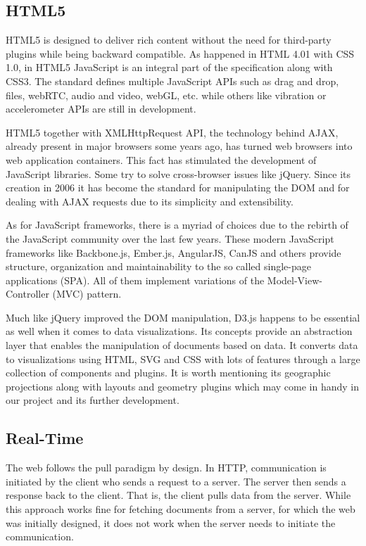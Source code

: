 \subsection{HTML5}

HTML5 is designed to deliver rich content without the need for third-party plugins while being backward compatible. As happened in HTML 4.01 with CSS 1.0, in HTML5 JavaScript is an integral part of the specification along with CSS3. The standard defines multiple JavaScript APIs such as drag and drop, files, webRTC, audio and video, webGL, etc. while others like vibration or accelerometer APIs are still in development.

HTML5 together with XMLHttpRequest API, the technology behind AJAX, already present in major browsers some years ago, has turned web browsers into web application containers. This fact has stimulated the development of JavaScript libraries. Some try to solve cross-browser issues like jQuery. Since its creation in 2006 it has become the standard for manipulating the DOM and for dealing with AJAX requests due to its simplicity and extensibility.

As for JavaScript frameworks, there is a myriad of choices due to the rebirth of the JavaScript community over the last few years. These modern JavaScript frameworks like Backbone.js, Ember.js, AngularJS, CanJS and others provide structure, organization and maintainability to the so called single-page applications (SPA). All of them implement variations of the Model-View-Controller (MVC) pattern.

Much like jQuery improved the DOM manipulation, D3.js happens to be essential as well when it comes to data visualizations. Its concepts provide an abstraction layer that enables the manipulation of documents based on data. It converts data to visualizations using HTML, SVG and CSS with lots of features through a large collection of components and plugins. It is worth mentioning its geographic projections along with layouts and geometry plugins which may come in handy in our project and its further development.

\subsection{Real-Time} \label{web_real_time}

The web follows the pull paradigm by design. In HTTP, communication is initiated by the client who sends a request to a server. The server then sends a response back to the client. That is, the client pulls data from the server. While this approach works fine for fetching documents from a server, for which the web was initially designed, it does not work when the server needs to initiate the communication.

